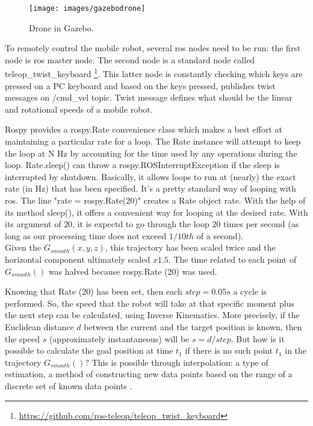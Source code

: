 \begin{figure}[H]
	\centering
	\texttt{[image: images/gazebodrone]}
	\caption[Drone in Gazebo.]{Drone in Gazebo.}
	\label{fig:drngaz}
\end{figure}

\noindent To remotely control the mobile robot, several \gls{ros} nodes need to be run: the first node is \gls{ros} master node. The second node is a standard node called teleop\_twist\_keyboard \footnote{\url{https://github.com/ros-teleop/teleop_twist_keyboard}}. This latter node is constantly checking which keys are pressed on a PC keyboard and based on the keys pressed, publishes twist messages on /cmd\_vel topic. Twist message defines what should be the linear and rotational speeds of a mobile robot.

\noindent Rospy provides a rospy.Rate convenience class which makes a best effort at maintaining a particular rate for a loop. The Rate instance will attempt to keep the loop at N Hz by accounting for the time used by any operations during the loop. Rate.sleep() can throw a rospy.ROSInterruptException if the sleep is interrupted by shutdown. Basically, it allows loops to run at (nearly) the exact rate (in Hz) that has been specified. It's a pretty standard way of looping with \gls{ros}. The line "rate = rospy.Rate(20)" creates a Rate object rate. With the help of its method sleep(), it offers a convenient way for looping at the desired rate. With its argument of $20$, it is expectd to go through the loop $20$ times per second (as long as our processing time does not exceed $1/10th$ of a second). \\

\noindent Given the $G_{smooth}(x, y, z)$, this trajectory has been scaled twice and the horizontal component ultimately scaled $x1.5$. The time related to each point of $G_{smooth}()$ was halved because rospy.Rate (20) was used.

\noindent Knowing that Rate ($20$) has been set, then each $step = 0.05s$ a cycle is performed. So, the speed that the robot will take at that specific moment plus the next step can be calculated, using Inverse Kinematics.  More precisely, if the Euclidean distance $d$ between the current and the target position is known, then the speed $s$ (approximately instantaneous) will be $s = d / step$. But how is it possible to calculate the goal position at time $t_1$ if there is no such point $t_1$ in the trajectory $G_{smooth}()$? This is possible through interpolation: a type of estimation, a method of constructing new data points based on the range of a discrete set of known data points \cite[]{Interpol33:online}. \\

